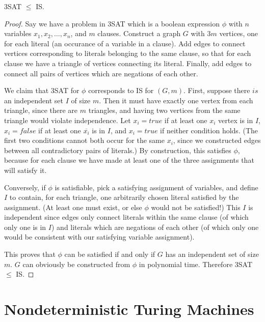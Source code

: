 \begin{Thm}
3SAT $\le$ IS.
\end{Thm}
\begin{proof}
Say we have a problem in 3SAT which is a boolean expression $\phi$ with $n$
variables $x_1, x_2, \dots, x_n$, and $m$ clauses.
Construct a graph $G$ with $3m$ vertices, one for each literal (an
occurance of a variable in a clause).  Add edges to connect vertices
corresponding to literals
belonging to the same clause, so that for each clause we have a triangle
of vertices connecting its literal.  Finally, add edges to connect all
pairs of vertices which are negations of each other.

We claim that 3SAT for $\phi$ corresponds to IS for $(G, m)$.  First,
suppose there $is$ an independent set $I$ of size $m$.  Then it must
have exactly one vertex from each triangle, since there are $m$ triangles,
and having two vertices from the same triangle would violate independence.
Let $x_i = true$ if at least one $x_i$ vertex is in $I$, $x_i = false$ if
at least one $\overline{x_i}$ is in $I$, and $x_i = true$ if neither condition
holds.  (The first two conditions cannot both occur for the same $x_i$,
since we constructed
edges between all contradictory pairs of literals.)  By construction,
this satisfies $\phi$, because for each clause we have made at least
one of the three assignments that will satisfy it.

Conversely, if $\phi$ is satisfiable, pick a satisfying assignment of
variables, and define $I$ to contain, for each triangle, one arbitrarily
chosen literal satisfied by the assignment.  (At least one must exist,
or else $\phi$ would not be satisfied!)  This $I$ is independent since
edges only connect literals within the same clause (of which only one
is in $I$) and literals which are negations of each other (of which only
one would be consistent with our satisfying variable assignment).

This proves that $\phi$ can be satisfied if and only if $G$ has an
independent set of size $m$.  $G$ can obviously be constructed from
$\phi$ in polynomial time.  Therefore 3SAT $\le$ IS.
\end{proof}

\section{Nondeterministic Turing Machines}

